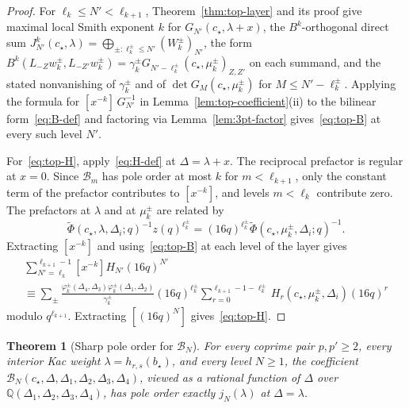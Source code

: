 \documentclass[twoside,10pt]{article}
\numberwithin{equation}{section}
\theoremstyle{slbody}
\newtheorem{theorem}{Theorem}[section]
\theoremstyle{definition}
\theoremstyle{remark}
\begin{document}
\begin{proof}
For \(\ell_k\leq N'<\ell_{k+1}\), Theorem~\ref{thm:top-layer} and its proof give maximal local Smith exponent
\(k\) for \(G_{N'}(c_\star,\lambda+x)\), the \(B^k\)-orthogonal direct sum
\(J^k_{N'}(c_\star,\lambda)=\bigoplus_{\pm:\ell^\pm_k\leq N'}(W^\pm_k)_{N'}\),
the form
\(B^k(L_{-Z}w^\pm_k,L_{-Z'}w^\pm_k)=\gamma^\pm_k G_{N'-\ell^\pm_k}(c_\star,\mu^\pm_k)_{Z,Z'}\)
on each summand, and the stated nonvanishing of \(\gamma^\pm_k\) and of
\(\det G_M(c_\star,\mu^\pm_k)\) for \(M\leq N'-\ell^\pm_k\).  Applying the
formula for \([x^{-k}]\,G_{N'}^{-1}\) in Lemma~\ref{lem:top-coefficient}(ii) to the bilinear
form~\eqref{eq:B-def} and factoring via
Lemma~\ref{lem:3pt-factor} gives~\eqref{eq:top-B} at every such level
\(N'\).

For~\eqref{eq:top-H}, apply~\eqref{eq:H-def} at \(\Delta=\lambda+x\).  The
reciprocal prefactor is regular at \(x=0\).  Since \(\mathcal B_m\) has pole
order at most \(k\) for \(m<\ell_{k+1}\), only the constant term of the
prefactor contributes to \([x^{-k}]\), and levels \(m<\ell_k\) contribute zero.
The prefactors at \(\lambda\) and at \(\mu^\pm_k\) are related by
\[
 \widetilde\Phi(c_\star,\lambda,\Delta_i;q)^{-1}z(q)^{\ell^\pm_k}
 =(16q)^{\ell^\pm_k}\widetilde\Phi(c_\star,\mu^\pm_k,\Delta_i;q)^{-1}.
\]
Extracting \([x^{-k}]\) and using~\eqref{eq:top-B} at each level of the layer
gives
\begin{multline*}
 \sum_{N'=\ell_k}^{\ell_{k+1}-1}[x^{-k}]H_{N'}(16q)^{N'}\\
 \equiv\sum_{\pm}\frac{\varphi^\pm_k(\Delta_4,\Delta_3)\varphi^\pm_k(\Delta_1,\Delta_2)}{\gamma^\pm_k}
   (16q)^{\ell^\pm_k}\sum_{r=0}^{\ell_{k+1}-1-\ell^\pm_k}H_r(c_\star,\mu^\pm_k,\Delta_i)(16q)^r
\end{multline*}
modulo \(q^{\ell_{k+1}}\).  Extracting \([(16q)^N]\) gives~\eqref{eq:top-H}.
\end{proof}

\begin{theorem}[Sharp pole order for \(\mathcal B_N\)]
\label{thm:sharp-B}
For every coprime pair \(p,p'\geq2\), every interior Kac weight
\(\lambda=h_{r,s}(b_\star)\), and every level \(N\geq1\), the coefficient
\(\mathcal B_N(c_\star,\Delta,\Delta_1,\Delta_2,\Delta_3,\Delta_4)\),
viewed as a rational function of \(\Delta\) over
\(\mathbb Q(\Delta_1,\Delta_2,\Delta_3,\Delta_4)\), has pole order exactly
\(j_N(\lambda)\) at \(\Delta=\lambda\).
\end{theorem}
\end{document}
